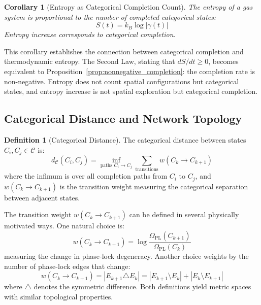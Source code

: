 \documentclass[12pt,a4paper]{article}
\newtheorem{corollary}[theorem]{Corollary}
\theoremstyle{definition}
\newtheorem{definition}[theorem]{Definition}
\theoremstyle{remark}
\newcommand{\catspace}{\mathcal{C}}
\begin{document}
\begin{corollary}[Entropy as Categorical Completion Count]
\label{cor:entropy_completion}
The entropy of a gas system is proportional to the number of completed categorical states:
\begin{equation}
S(t) = k_B \log |\gamma(t)|
\end{equation}
Entropy increase corresponds to categorical completion.
\end{corollary}

This corollary establishes the connection between categorical completion and thermodynamic entropy. The Second Law, stating that $dS/dt \geq 0$, becomes equivalent to Proposition~\ref{prop:nonnegative_completion}: the completion rate is non-negative. Entropy does not count spatial configurations but categorical states, and entropy increase is not spatial exploration but categorical completion.

\subsection{Categorical Distance and Network Topology}

\begin{definition}[Categorical Distance]
\label{def:categorical_distance}
The categorical distance between states $C_i, C_j \in \catspace$ is:
\begin{equation}
d_{\catspace}(C_i, C_j) = \inf_{\text{paths } C_i \to C_j} \sum_{\text{transitions}} w(C_k \to C_{k+1})
\label{eq:categorical_distance}
\end{equation}
where the infimum is over all completion paths from $C_i$ to $C_j$, and $w(C_k \to C_{k+1})$ is the transition weight measuring the categorical separation between adjacent states.
\end{definition}

The transition weight $w(C_k \to C_{k+1})$ can be defined in several physically motivated ways. One natural choice is:
\begin{equation}
w(C_k \to C_{k+1}) = \log \frac{\Omega_{\text{PL}}(C_{k+1})}{\Omega_{\text{PL}}(C_k)}
\end{equation}
measuring the change in phase-lock degeneracy. Another choice weights by the number of phase-lock edges that change:
\begin{equation}
w(C_k \to C_{k+1}) = |E_{k+1} \triangle E_k| = |E_{k+1} \setminus E_k| + |E_k \setminus E_{k+1}|
\end{equation}
where $\triangle$ denotes the symmetric difference. Both definitions yield metric spaces with similar topological properties.
\end{document}
